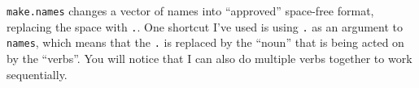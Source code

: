 \documentclass[12pt,letterpaperpaper,openany]{book}
\newenvironment{Shaded}{\begin{snugshade}}{\end{snugshade}}
\newcommand{\KeywordTok}[1]{\textcolor[rgb]{0.13,0.29,0.53}{\textbf{#1}}}
\newcommand{\NormalTok}[1]{#1}
\newcommand{\OperatorTok}[1]{\textcolor[rgb]{0.81,0.36,0.00}{\textbf{#1}}}
\newcommand{\StringTok}[1]{\textcolor[rgb]{0.31,0.60,0.02}{#1}}
\begin{document}
\begin{Shaded}
\end{Shaded}

\texttt{make.names} changes a vector of names into ``approved'' space-free format, replacing
the space with \texttt{.}. One shortcut I've used is using \texttt{.} as an argument to \texttt{names}, which
means that the \texttt{.} is replaced by the ``noun'' that is being acted on by the ``verbs''. You will
notice that I can also do multiple verbs together to work sequentially.
\end{document}
